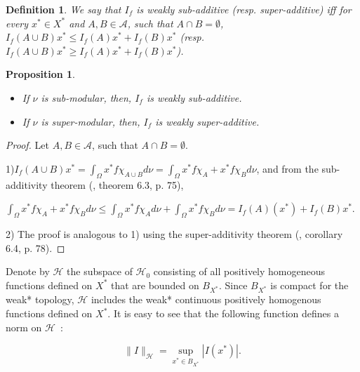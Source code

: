 \documentclass[preprint,authoryear,12pt]{article}%
\newtheorem{proposition}{Proposition}
\newtheorem{definition}{Definition\rm}
\theoremstyle{definition}
\renewcommand{\AA}{{\mathcal A}}
\newcommand{\HH}{{\mathcal H}}
\begin{document}
\begin{definition}
We say that ${I}_f$ is weakly sub-additive (resp. super-additive) iff for every $x^*\in X^*$ and $A,B\in \AA$, such that $A\cap B=\emptyset$, $  I_f (A\cup B) x^* \leq   I_f (A)x^*+  I_f (B) x^*$  (resp. $  I_f (A\cup B)x^*\geq   I_f (A)x^*+  I_f (B) x^*$).
\end{definition}

\begin{proposition}\label{PWA}$\;$
\begin{itemize} 
\item[1)]If $\nu$ is  sub-modular, then, $  I_f$ is weakly sub-additive.
\item[2)]If $\nu$ is super-modular, then, $  I_f$ is weakly super-additive. 
\end{itemize}
\end{proposition}

\begin{proof}Let $A,B\in \AA$, such that $A\cap B=\emptyset$.

1)$\displaystyle  I_f(A\cup B)x^*=\int_\Omega x^* f \chi_{A\cup B} d\nu=\int_\Omega x^* f\chi_A+x^* f\chi_B d\nu$, and from the sub-additivity theorem (\citet{DEN94}, theorem 6.3, p. 75), 

$\displaystyle \int_\Omega x^* f\chi_A+x^* f\chi_B d\nu\leq \int_\Omega x^* f\chi_{A} d\nu+ \int_\Omega x^* f\chi_B d\nu=  I_f(A)(x^*)+  I_f(B)x^*$. 


2) The proof is analogous to 1) using the super-additivity theorem (\citet{DEN94}, corollary 6.4, p. 78). 

\end{proof}




Denote by $\HH$ the subspace of $\HH_0$ consisting of all positively homogeneous functions defined on $X^*$ that are bounded on $B_{X^*}$. Since $B_{X^*}$ is compact for the weak* topology, $\HH$ includes the weak* continuous positively homogenous functions defined on $X^*$. It is easy to see that the following function defines a norm on $\HH$~: 

$$ \|I\|_\HH=\underset{x^*\in B_{X^*} }{\sup} |I(x^*)|.$$ 

\end{document}
